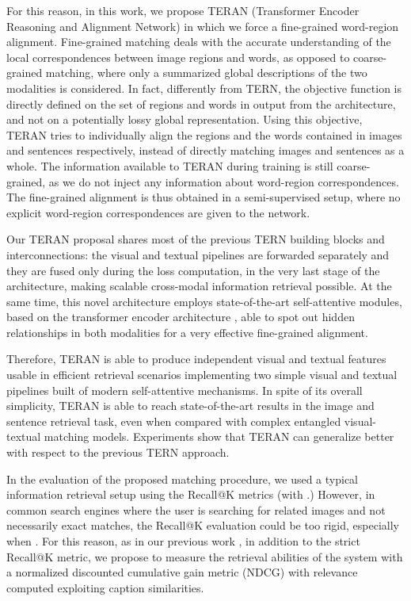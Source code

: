 \documentclass[acmsmall]{acmart}
\newcommand{\majorrevised}[1]{#1}
\begin{document}
\majorrevised{For this reason, in this work, we propose TERAN (Transformer Encoder Reasoning and Alignment Network) in which we force a fine-grained word-region alignment. Fine-grained matching deals with the accurate understanding of the local correspondences between image regions and words, as opposed to coarse-grained matching, where only a summarized global descriptions of the two modalities is considered.
In fact, differently from TERN, the objective function is directly defined on the set of regions and words in output from the architecture, and not on a potentially lossy global representation. Using this objective, TERAN tries to individually align the regions and the words contained in images and sentences respectively, instead of directly matching images and sentences as a whole. The information available to TERAN during training is still coarse-grained, as we do not inject any information about word-region correspondences. The fine-grained alignment is thus obtained in a semi-supervised setup, where no explicit word-region correspondences are given to the network.}









Our TERAN proposal shares most of the previous TERN building blocks and interconnections: the visual and textual pipelines are forwarded separately and they are fused only during the loss computation, in the very last stage of the architecture, making scalable cross-modal information retrieval possible. At the same time, this novel architecture employs state-of-the-art self-attentive modules, based on the transformer encoder architecture \cite{vaswani2017transformer}, able to spot out hidden relationships in both modalities for a very effective fine-grained alignment. 



\majorrevised{Therefore, TERAN is able to produce independent visual and textual features usable in efficient retrieval scenarios implementing two simple visual and textual pipelines built of modern self-attentive mechanisms. In spite of its overall simplicity, TERAN is able to reach state-of-the-art results in the image and sentence retrieval task, even when compared with complex entangled visual-textual matching models. Experiments show that TERAN can generalize better with respect to the previous TERN approach.}

In the evaluation of the proposed matching procedure, we used a typical information retrieval setup using the Recall@K metrics (with .)
However, in common search engines where the user is searching for related images and not necessarily exact matches, the Recall@K evaluation could be too rigid, especially when .
For this reason, as in our previous work \cite{messina2020tern}, in addition to the strict Recall@K metric, we propose to measure the retrieval abilities of the system with a normalized discounted cumulative gain metric (NDCG) with relevance computed exploiting caption similarities.
\end{document}
